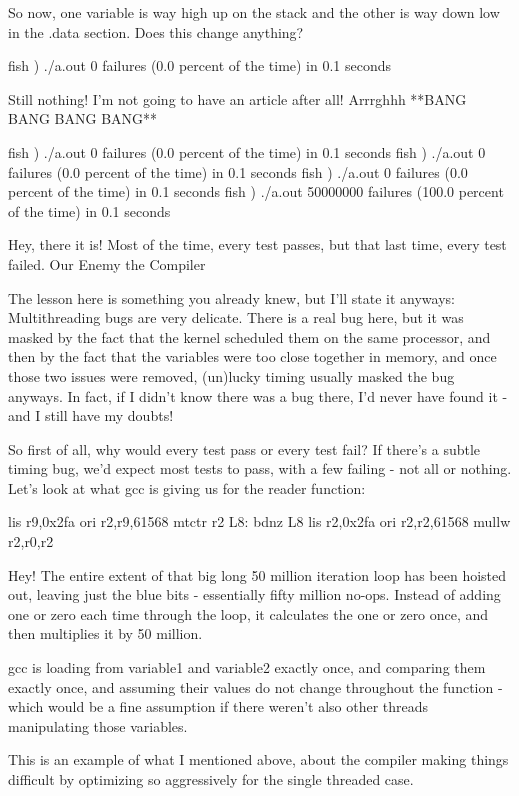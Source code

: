 {So now, one variable is way high up on the stack and the other is way down low in the .data section. Does this change anything?

fish ) ./a.out
0 failures (0.0 percent of the time) in 0.1 seconds

Still nothing! I'm not going to have an article after all! Arrrghhh **BANG BANG BANG BANG**

fish ) ./a.out
0 failures (0.0 percent of the time) in 0.1 seconds
fish ) ./a.out
0 failures (0.0 percent of the time) in 0.1 seconds
fish ) ./a.out
0 failures (0.0 percent of the time) in 0.1 seconds
fish ) ./a.out
50000000 failures (100.0 percent of the time) in 0.1 seconds

Hey, there it is! Most of the time, every test passes, but that last time, every test failed.
Our Enemy the Compiler

The lesson here is something you already knew, but I'll state it anyways: Multithreading bugs are very delicate. There is a real bug here, but it was masked by the fact that the kernel scheduled them on the same processor, and then by the fact that the variables were too close together in memory, and once those two issues were removed, (un)lucky timing usually masked the bug anyways. In fact, if I didn't know there was a bug there, I'd never have found it - and I still have my doubts!

So first of all, why would every test pass or every test fail? If there's a subtle timing bug, we'd expect most tests to pass, with a few failing - not all or nothing. Let's look at what gcc is giving us for the reader function:

        lis r9,0x2fa
        ori r2,r9,61568
        mtctr r2
L8:
        bdnz L8
        lis r2,0x2fa
        ori r2,r2,61568
        mullw r2,r0,r2

Hey! The entire extent of that big long 50 million iteration loop has been hoisted out, leaving just the blue bits - essentially fifty million no-ops. Instead of adding one or zero each time through the loop, it calculates the one or zero once, and then multiplies it by 50 million.

gcc is loading from variable1 and variable2 exactly once, and comparing them exactly once, and assuming their values do not change throughout the function - which would be a fine assumption if there weren't also other threads manipulating those variables.

This is an example of what I mentioned above, about the compiler making things difficult by optimizing so aggressively for the single threaded case.

}
